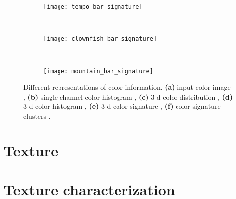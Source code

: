 \begin{figure}[!ht]
    \begin{subfigure}[t]{\textwidth+20pt\relax}
    	\makebox[20pt]{\raisebox{25pt}{}}%
    	\texttt{[image: tempo\_bar\_signature]}
    \end{subfigure}~ 
    \begin{subfigure}[b]{0.32\textwidth}
        \texttt{[image: clownfish\_bar\_signature]}
    \end{subfigure}~
    \begin{subfigure}[b]{0.32\textwidth}
        \texttt{[image: mountain\_bar\_signature]}
    \end{subfigure}
                    
	\caption{Different representations of color information. {\small \textsf{\textbf{(a)}}} input color image , {\small \textsf{\textbf{(b)}}} single-channel color histogram , {\small \textsf{\textbf{(c)}}} 3-d color distribution , {\small \textsf{\textbf{(d)}}} 3-d color histogram , {\small \textsf{\textbf{(e)}}} 3-d color signature , {\small \textsf{\textbf{(f)}}} color signature clusters .}\label{fig:color_image_representations}    
\end{figure}


\section{Texture}

\section{Texture characterization}


